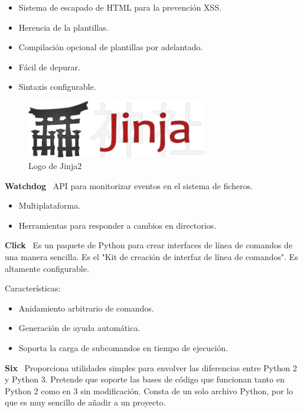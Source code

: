 \begin{itemize}
    \item Sistema de escapado de HTML para la prevención XSS.
    \item Herencia de la plantillas.
    \item Compilación opcional de plantillas por adelantado.
    \item Fácil de depurar.
    \item Sintaxis configurable.
\end{itemize}

\begin{figure}[htbp]
    \centering
    \includegraphics[width=0.7\textwidth]{6_implementacion/jinja_logo}
    \caption{Logo de Jinja2}
    \label{fig:jinja-logo}
\end{figure}

\textbf{Watchdog}~\cite{watchdog} API para monitorizar eventos en el sistema de ficheros.

\begin{itemize}
    \item Multiplataforma.
    \item Herramientas para responder a cambios en directorios.
\end{itemize}

\textbf{Click}~\cite{click} Es un paquete de Python para crear interfaces de línea de comandos de una manera
sencilla. Es el "Kit de creación de interfaz de
línea de comandos". Es altamente configurable.

Características:

\begin{itemize}
    \item Anidamiento arbitrario de comandos.
    \item Generación de ayuda automática.
    \item Soporta la carga de subcomandos en tiempo de ejecución.
\end{itemize}

\textbf{Six}~\cite{six} Proporciona utilidades simples para envolver las diferencias entre Python 2 y Python 3. Pretende
que soporte las bases de código que funcionan tanto en Python 2 como en 3 sin modificación.
Consta de un solo archivo Python, por lo que es muy sencillo de añadir a un proyecto.


